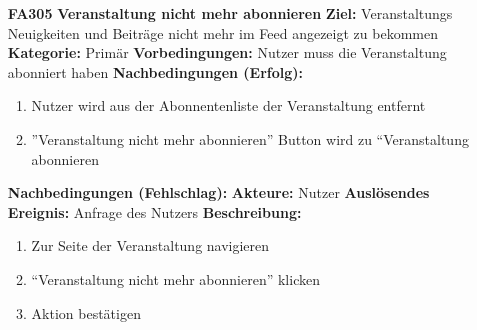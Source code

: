 \documentclass[parskip=full]{scrartcl}
\begin{document}
\begin{itemize}[nosep]
			
			\item[\textbf{FA305}]\textbf{Veranstaltung nicht mehr abonnieren}
			\newline \textbf{Ziel:} Veranstaltungs Neuigkeiten und Beiträge nicht mehr im \gls{Feed} angezeigt zu bekommen
			\newline \textbf{Kategorie:} Primär
			\newline \textbf{Vorbedingungen:} Nutzer muss die Veranstaltung abonniert haben
			\newline \textbf{Nachbedingungen (Erfolg):} 
			\begin{enumerate}[nosep]
				\item Nutzer wird aus der \gls{Abonnenten}liste der Veranstaltung entfernt
				\item ”Veranstaltung nicht mehr abonnieren” \gls{Button} wird zu “Veranstaltung abonnieren 
			\end{enumerate}
			\textbf{Nachbedingungen (Fehlschlag):}
			\newline \textbf{Akteure:} Nutzer
			\newline \textbf{Auslösendes Ereignis:} Anfrage des Nutzers
			\newline \textbf{Beschreibung:}
			\begin{enumerate}[nosep]
				\item Zur Seite der Veranstaltung navigieren
				\item “Veranstaltung nicht mehr abonnieren” klicken
				\item  Aktion bestätigen\\
			\end{enumerate}
			

\end{itemize}
\end{document}
